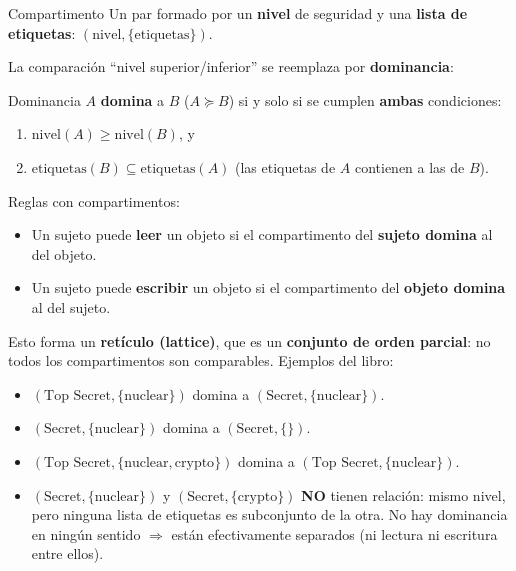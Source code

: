 \documentclass[../main.tex]{subfiles}
\begin{document}
\begin{definicion}{Compartimento}
Un par formado por un \textbf{nivel} de seguridad y una \textbf{lista de etiquetas}: $(\text{nivel}, \{\text{etiquetas}\})$.
\end{definicion}

La comparación ``nivel superior/inferior'' se reemplaza por \textbf{dominancia}:

\begin{definicion}{Dominancia}
$A$ \textbf{domina} a $B$ ($A \succeq B$) si y solo si se cumplen \textbf{ambas} condiciones:
\begin{enumerate}[nosep]
  \item $\text{nivel}(A) \geq \text{nivel}(B)$, y
  \item $\text{etiquetas}(B) \subseteq \text{etiquetas}(A)$ (las etiquetas de $A$ contienen a las de $B$).
\end{enumerate}
\end{definicion}

Reglas con compartimentos:
\begin{itemize}[nosep]
  \item Un sujeto puede \textbf{leer} un objeto si el compartimento del \textbf{sujeto domina} al del objeto.
  \item Un sujeto puede \textbf{escribir} un objeto si el compartimento del \textbf{objeto domina} al del sujeto.
\end{itemize}

Esto forma un \textbf{retículo (lattice)}, que es un \textbf{conjunto de orden parcial}: no todos los compartimentos son comparables. Ejemplos del libro:
\begin{itemize}[nosep]
  \item $(\text{Top Secret},\{\text{nuclear}\})$ domina a $(\text{Secret},\{\text{nuclear}\})$.
  \item $(\text{Secret},\{\text{nuclear}\})$ domina a $(\text{Secret},\{\})$.
  \item $(\text{Top Secret},\{\text{nuclear},\text{crypto}\})$ domina a $(\text{Top Secret},\{\text{nuclear}\})$.
  \item $(\text{Secret},\{\text{nuclear}\})$ y $(\text{Secret},\{\text{crypto}\})$ \textbf{NO} tienen relación: mismo nivel, pero ninguna lista de etiquetas es subconjunto de la otra. No hay dominancia en ningún sentido $\Rightarrow$ están efectivamente separados (ni lectura ni escritura entre ellos).
\end{itemize}
\end{document}
